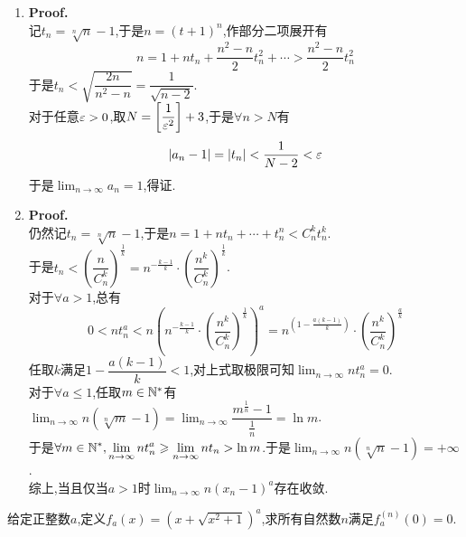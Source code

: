 \documentclass{ctexart}
\begin{document}
\begin{solution}
    \begin{enumerate}[label=\textbf{(\arabic*)}]
        \item \textbf{Proof.}\\
            记$t_n=\sqrt[n]{n}-1$,于是$n=\left(t+1\right)^n$,作部分二项展开有
            $$n=1+nt_n+\dfrac{n^2-n}{2}t_n^2+\cdots>\dfrac{n^2-n}{2}t_n^2$$
            于是$t_n<\sqrt{\dfrac{2n}{n^2-n}}=\dfrac{1}{\sqrt{n-2}}$.\\
            对于任意$\varepsilon>0$,取$N=\left[\dfrac{1}{\varepsilon^2}\right]+3$,于是$\forall n>N$有
            $$\left|a_n-1\right|=\left|t_n\right|<\dfrac{1}{N-2}<\varepsilon$$
            于是$\displaystyle\lim_{n\to\infty}a_n=1$,得证.
        \item \textbf{Proof.}\\
            仍然记$t_n=\sqrt[n]{n}-1$,于是$n=1+nt_n+\cdots+t_n^n<C_n^kt_n^k$.\\
            于是$t_n<\left(\dfrac{n}{C_n^k}\right)^{\frac{1}{k}}=n^{-\frac{k-1}{k}}\cdot\left(\dfrac{n^k}{C_n^k}\right)^{\frac{1}{k}}$.\\
            对于$\forall a>1$,总有
            $$0<nt_n^a<n\left(n^{-\frac{k-1}{k}}\cdot\left(\dfrac{n^k}{C_n^k}\right)^{\frac{1}{k}}\right)^a=n^{\left(1-\frac{a(k-1)}{k}\right)}\cdot\left(\dfrac{n^k}{C_n^k}\right)^{\frac{a}{k}}$$
            任取$k$满足$1-\dfrac{a(k-1)}{k}<1$,对上式取极限可知$\displaystyle\lim_{n\to\infty}nt_n^a=0$.\\
            对于$\forall a\leqslant 1$,任取$m\in\mathbb{N}^*$有$\displaystyle\lim_{n\to\infty}n\left(\sqrt[n]{m}-1\right)=\lim_{n\to\infty}\dfrac{m^{\frac{1}{n}}-1}{\frac{1}{n}}=\ln m$.\\
            于是$\displaystyle\forall m\in\mathbb{N}^*,\lim_{n\to\infty}nt_n^a\geqslant\lim_{n\to\infty}nt_n>\ln m$.于是$\displaystyle\lim_{n\to\infty}n\left(\sqrt[n]{n}-1\right)=+\infty$.\\
            综上,当且仅当$a>1$时$\displaystyle\lim_{n\to\infty}n\left(x_n-1\right)^a$存在收敛.
    \end{enumerate}
\end{solution}
\begin{problem}[9.(8\songti{分})]
    给定正整数$a$,定义$f_a(x)=\left(x+\sqrt{x^2+1}\right)^a$,求所有自然数$n$满足$f_a^{(n)}(0)=0$.
\end{problem}
\end{document}
